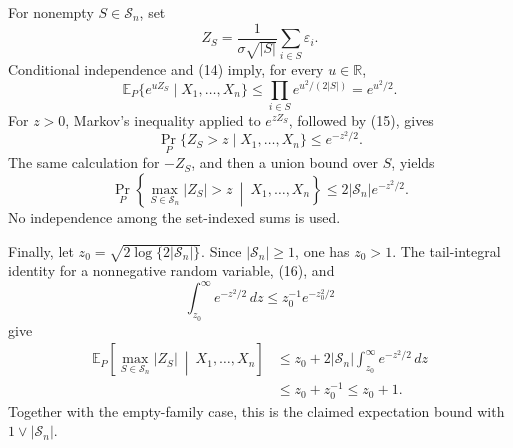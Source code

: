 For nonempty \(S\in\mathscr S_n\), set
\[
 Z_S=\frac1{\sigma\sqrt{|S|}}\sum_{i\in S}\varepsilon_i.
\]
Conditional independence and (14) imply, for every \(u\in\mathbb R\),
\[
 \mathbb E_P\{e^{uZ_S}\mid X_1,\ldots,X_n\}
 \le\prod_{i\in S}e^{u^2/(2|S|)}=e^{u^2/2}. \tag{15}
\]
For \(z>0\), Markov's inequality applied to \(e^{zZ_S}\), followed by (15), gives
\[
 \Pr_P\{Z_S>z\mid X_1,\ldots,X_n\}\le e^{-z^2/2}.
\]
The same calculation for \(-Z_S\), and then a union bound over \(S\), yields
\[
 \Pr_P\left\{\max_{S\in\mathscr S_n}|Z_S|>z
 \ \middle|\ X_1,\ldots,X_n\right\}
 \le2|\mathscr S_n|e^{-z^2/2}. \tag{16}
\]
No independence among the set-indexed sums is used.

Finally, let \(z_0=\sqrt{2\log\{2|\mathscr S_n|\}}\).  Since \(|\mathscr S_n|\ge1\), one has \(z_0>1\).  The tail-integral identity for a nonnegative random variable, (16), and
\[
 \int_{z_0}^{\infty}e^{-z^2/2}\,dz\le z_0^{-1}e^{-z_0^2/2}
\]
give
\[
 \begin{aligned}
 \mathbb E_P\left[\max_{S\in\mathscr S_n}|Z_S|
 \ \middle|\ X_1,\ldots,X_n\right]
 &\le z_0+2|\mathscr S_n|\int_{z_0}^{\infty}e^{-z^2/2}\,dz\\
 &\le z_0+z_0^{-1}\le z_0+1.
 \end{aligned}
\]
Together with the empty-family case, this is the claimed expectation bound with \(1\vee|\mathscr S_n|\).